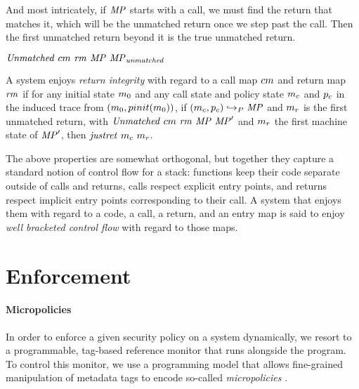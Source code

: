 \documentclass[acmsmall,review,anonymous]{acmart}\settopmatter{printfolios=true,printccs=false,printacmref=false}
\begin{document}
And most intricately, if \(\mathit{MP}\) starts with a call, we must find the
return that matches it, which will be the unmatched return once we
step past the call. Then the first unmatched return beyond it is the
true unmatched return.

            {\(\mathit{Unmatched}\ \callmap\ \retmap\ \MPT\ \MPT_{\mathit{unmatched}}\)}

A system enjoys {\em return integrity} with regard to a call map
\(cm\) and return map \(\mathit{rm}\) if for any initial state
\(m_0\) and any call state and policy state \(m_c\) and
\(p_c\) in the induced trace from
\((m_0,pinit(m_0))\), if \((m_c,p_c)
\hookrightarrow_P \mathit{MP}\) and \(m_r\) is the first unmatched
return, with \(\mathit{Unmatched}\ \callmap\ \retmap\ \MPT \ \MPT'\)
and \(m_r\) the first machine state of \(\mathit{MP}'\), then
\(\mathit{justret}\ m_c\ m_r\).

The above properties are somewhat orthogonal, but together they
capture a standard notion of control flow for a stack: functions keep
their code separate outside of calls and returns, calls respect
explicit entry points, and returns respect implicit entry points
corresponding to their call.  A system that enjoys them with regard to
a code, a call, a return, and an entry map is said to enjoy {\em well
  bracketed control flow} with regard to those maps.


\section{Enforcement}
\label{sec:enforcement}


\paragraph*{Micropolicies}
%
In order to enforce a given security policy on a system dynamically, we resort
to a programmable, tag-based reference monitor that runs alongside the program.
To control this monitor, we use a programming model that allows fine-grained
manipulation of metadata tags to encode so-called \emph{micropolicies}
.
\end{document}

